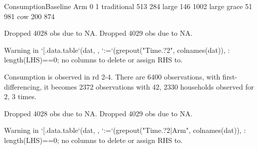 \begin{Schunk}
\begin{Soutput}
             ConsumptionBaseline
Arm              0    1
  traditional  513  284
  large        146 1002
  large grace   51  981
  cow          200  874
\end{Soutput}
\begin{Soutput}
Dropped 4028 obs due to NA.
Dropped 4029 obs due to NA.
\end{Soutput}
\begin{Soutput}
Warning in `[.data.table`(dat, , `:=`(grepout("Time.?2", colnames(dat)), : length(LHS)==0; no columns to delete or assign RHS to.
\end{Soutput}
\end{Schunk}

Consumption is observed in rd 2-4. There are 6400 observations, with first-differencing, it becomes 2372 observations with 42, 2330 households observed for 2, 3 times. 

\begin{Schunk}
\begin{Soutput}
Dropped 4028 obs due to NA.
Dropped 4029 obs due to NA.
\end{Soutput}
\begin{Soutput}
Warning in `[.data.table`(dat, , `:=`(grepout("Time.?2|Arm", colnames(dat)), : length(LHS)==0; no columns to delete or assign RHS to.
\end{Soutput}
\end{Schunk}








